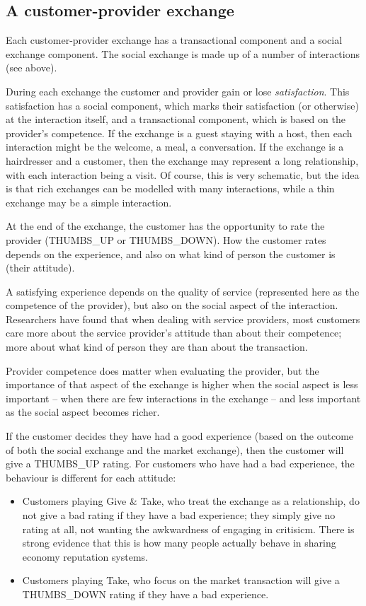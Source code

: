 \documentclass[
  letterpaper,
  DIV=11,
  numbers=noendperiod]{scrartcl}
\providecommand{\tightlist}{%
  \setlength{\itemsep}{0pt}\setlength{\parskip}{0pt}}\usepackage{longtable,booktabs,array}
\begin{document}
\hypertarget{a-customer-provider-exchange}{%
\subsection{A customer-provider
exchange}\label{a-customer-provider-exchange}}

Each customer-provider exchange has a transactional component and a
social exchange component. The social exchange is made up of a number of
interactions (see above).

During each exchange the customer and provider gain or lose
\emph{satisfaction}. This satisfaction has a social component, which
marks their satisfaction (or otherwise) at the interaction itself, and a
transactional component, which is based on the provider's competence. If
the exchange is a guest staying with a host, then each interaction might
be the welcome, a meal, a conversation. If the exchange is a hairdresser
and a customer, then the exchange may represent a long relationship,
with each interaction being a visit. Of course, this is very schematic,
but the idea is that rich exchanges can be modelled with many
interactions, while a thin exchange may be a simple interaction.

At the end of the exchange, the customer has the opportunity to rate the
provider (THUMBS\_UP or THUMBS\_DOWN). How the customer rates depends on
the experience, and also on what kind of person the customer is (their
attitude).

A satisfying experience depends on the quality of service (represented
here as the competence of the provider), but also on the social aspect
of the interaction. Researchers have found that when dealing with
service providers, most customers care more about the service provider's
attitude than about their competence; more about what kind of person
they are than about the transaction.

Provider competence does matter when evaluating the provider, but the
importance of that aspect of the exchange is higher when the social
aspect is less important -- when there are few interactions in the
exchange -- and less important as the social aspect becomes richer.

If the customer decides they have had a good experience (based on the
outcome of both the social exchange and the market exchange), then the
customer will give a THUMBS\_UP rating. For customers who have had a bad
experience, the behaviour is different for each attitude:

\begin{itemize}
\tightlist
\item
  Customers playing Give \& Take, who treat the exchange as a
  relationship, do not give a bad rating if they have a bad experience;
  they simply give no rating at all, not wanting the awkwardness of
  engaging in critisicm. There is strong evidence that this is how many
  people actually behave in sharing economy reputation systems.
\item
  Customers playing Take, who focus on the market transaction will give
  a THUMBS\_DOWN rating if they have a bad experience.
\end{itemize}
\end{document}
